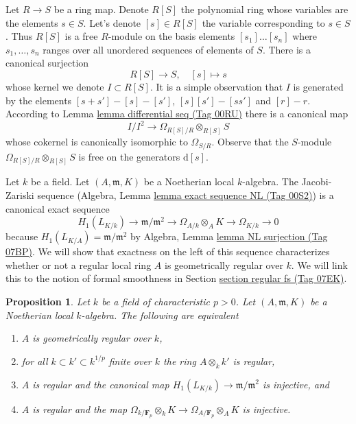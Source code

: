 \documentclass{amsart}
\theoremstyle{plain}
\newtheorem{proposition}[subsection]{Proposition}
\theoremstyle{definition}
\theoremstyle{remark}
\numberwithin{equation}{subsection}
\begin{document}
\noindent
Let $R \to S$ be a ring map. Denote $R[S]$ the polynomial ring
whose variables are the elements $s \in S$. Let's denote $[s] \in R[S]$
the variable corresponding to $s \in S$. Thus $R[S]$ is a free
$R$-module on the basis elements $[s_1] \ldots [s_n]$ where
$s_1, \ldots, s_n$ ranges over all unordered sequences of elements of $S$.
There is a canonical surjection
\begin{equation}
\label{algebra-equation-canonical-presentation}
R[S] \longrightarrow S,\quad [s] \longmapsto s
\end{equation}
whose kernel we denote $I \subset R[S]$. It is a simple observation that
$I$ is generated by the elements
$[s + s'] - [s] - [s']$, $[s][s'] - [ss']$ and $[r] - r$.
According to Lemma \href{https://stacks.math.columbia.edu/tag/00RU}{lemma differential seq (Tag 00RU)}
there is a canonical map
\begin{equation}
\label{algebra-equation-naive-cotangent-complex}
I/I^2 \longrightarrow \Omega_{R[S]/R} \otimes_{R[S]} S
\end{equation}
whose cokernel is canonically isomorphic to $\Omega_{S/R}$. Observe that
the $S$-module $\Omega_{R[S]/R} \otimes_{R[S]} S$ is free on the generators
$\text{d}[s]$.


\noindent
Let $k$ be a field. Let $(A, \mathfrak m, K)$ be a Noetherian local
$k$-algebra. The Jacobi-Zariski sequence
(Algebra, Lemma \href{https://stacks.math.columbia.edu/tag/00S2}{lemma exact sequence NL (Tag 00S2)})
is a canonical exact sequence
$$
H_1(L_{K/k}) \to \mathfrak m/\mathfrak m^2 \to \Omega_{A/k} \otimes_A K \to
\Omega_{K/k} \to 0
$$
because $H_1(L_{K/A}) = \mathfrak m/\mathfrak m^2$ by
Algebra, Lemma \href{https://stacks.math.columbia.edu/tag/07BP}{lemma NL surjection (Tag 07BP)}.
We will show that exactness on the left of this sequence characterizes
whether or not a regular local ring $A$ is geometrically regular over $k$.
We will link this to the notion of formal smoothness in
Section \href{https://stacks.math.columbia.edu/tag/07EK}{section regular fs (Tag 07EK)}.


\begin{proposition}
\label{proposition-characterization-geometrically-regular}
Let $k$ be a field of characteristic $p > 0$.
Let $(A, \mathfrak m, K)$ be a Noetherian local
$k$-algebra. The following are equivalent
\begin{enumerate}
\item $A$ is geometrically regular over $k$,
\item for all $k \subset k' \subset k^{1/p}$
finite over $k$ the ring $A \otimes_k k'$ is regular,
\item $A$ is regular and the canonical map
$H_1(L_{K/k}) \to \mathfrak m/\mathfrak m^2$ is injective, and
\item $A$ is regular and the map
$\Omega_{k/\mathbf{F}_p} \otimes_k K \to \Omega_{A/\mathbf{F}_p} \otimes_A K$
is injective.
\end{enumerate}
\end{proposition}
\end{document}
